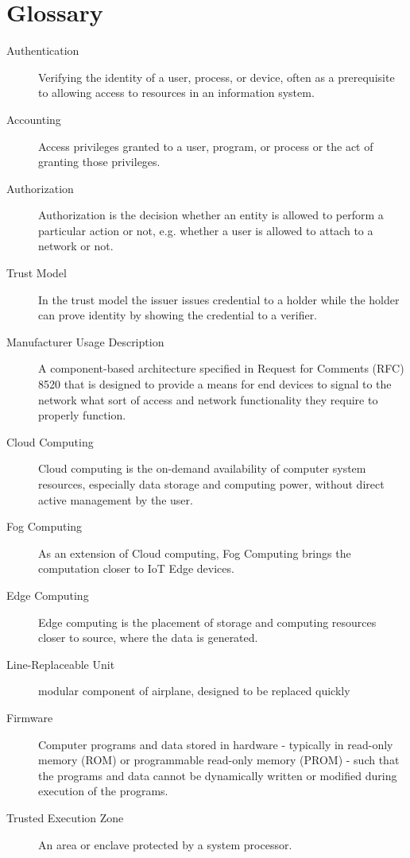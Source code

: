 \chapter*{Glossary}


\begin{description}
	\item[Authentication] Verifying the identity of a user, process, or device, often as a prerequisite to
		allowing access to resources in an information system. \cite{nist:glossary}
	\item[Accounting] Access privileges granted to a user, program, or process or the act of granting those
		privileges. \cite{nist:glossary}
	\item[Authorization] Authorization is the decision whether an entity is allowed to perform a particular action
		or not, e.g. whether a user is allowed to attach to a network or not.
	\item[Trust Model] In the trust model the issuer issues credential to a holder while the holder can prove
		identity by showing the credential to a verifier.
	\item [Manufacturer Usage Description] A component-based architecture specified in Request for Comments (RFC)
	      8520 that is designed to provide a means for end devices to signal to the network what sort of access and
	      network functionality they require to properly function. \cite{nist:glossary}
	\item [Cloud Computing] Cloud computing is the on-demand availability of computer system resources, especially
	      data storage and computing power, without direct active management by the user. \cite{nist:glossary}
	\item [Fog Computing] As an extension of Cloud computing, Fog Computing brings the computation closer to IoT
	      Edge devices. \cite{nist:glossary}
	\item [Edge Computing] Edge computing is the placement of storage and computing resources closer to source, where
	      the data is generated. \cite{nist:glossary}
	\item [Line-Replaceable Unit] modular component of airplane, designed to be replaced quickly
	\item [Firmware] Computer programs and data stored in hardware - typically in read-only memory (ROM) or
	      programmable read-only memory (PROM) - such that the programs and data cannot be dynamically written
	      or modified during execution of the programs. \cite{nist:glossary}
	\item [Trusted Execution Zone] An area or enclave protected by a system processor. \cite{nist:glossary}
\end{description}
